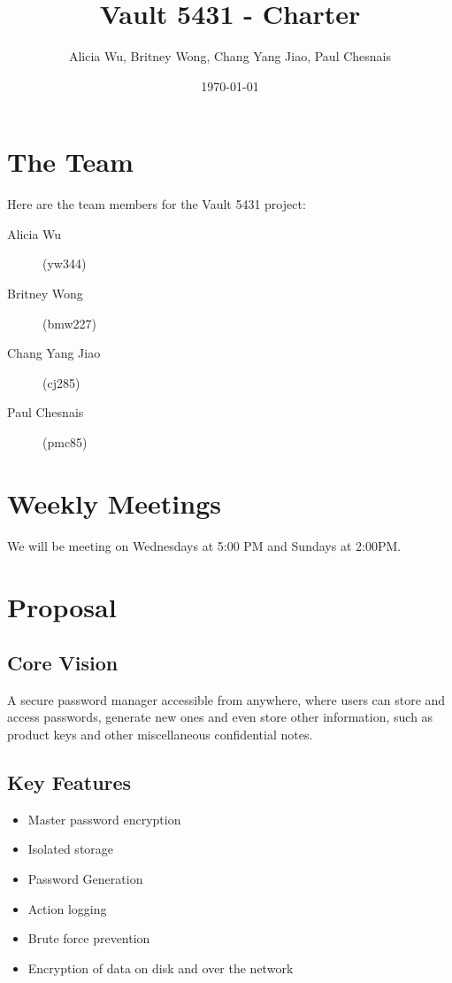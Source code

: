 \documentclass{article}
\title{Vault 5431 - Charter}
\author{Alicia Wu, Britney Wong, Chang Yang Jiao, Paul Chesnais}
\date{\today}
\begin{document}
\maketitle
\thispagestyle{empty}

\section{The Team}
\label{sec:the_team}

Here are the team members for the Vault 5431 project:
\begin{description}
  \item[Alicia Wu] (yw344)
  \item[Britney Wong] (bmw227)
  \item[Chang Yang Jiao] (cj285)
  \item[Paul Chesnais] (pmc85)
\end{description}

\section{Weekly Meetings}
\label{sec:weekly_meetings}
We will be meeting on Wednesdays at 5:00 PM and Sundays at 2:00PM.

\section{Proposal}
\label{sec:proposal}

\subsection{Core Vision}
\label{sub:core_vision}

A secure password manager accessible from anywhere, where users can store and access passwords, generate new ones and even store other information, such as product keys and other miscellaneous confidential notes.

\subsection{Key Features}
\label{sub:key_features}
\begin{itemize}
  \item Master password encryption %
  \item Isolated storage %
  \item Password Generation
  \item Action logging %
  \item Brute force prevention %
  \item Encryption of data on disk and over the network %
\end{itemize}
\end{document}

